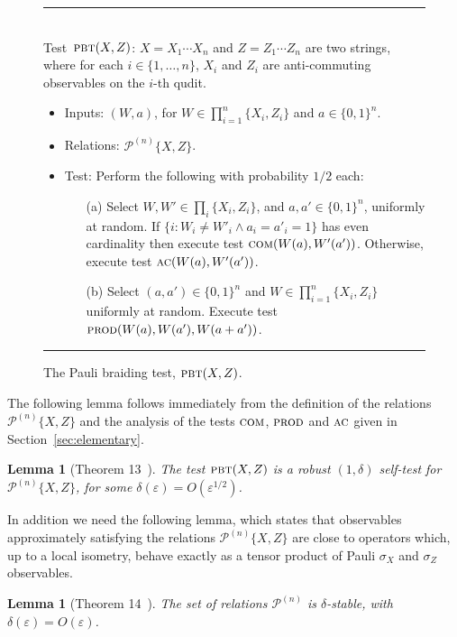 \documentclass[11pt]{article}
\newtheorem{lemma}[theorem]{Lemma}
\theoremstyle{remark}
\theoremstyle{definition}
\newcommand{\eps}{\varepsilon}
\newcommand{\pbt}{\textsc{pbt}}
\newcommand{\prodt}{\textsc{prod}}
\newcommand{\comt}{\textsc{com}}
\newcommand{\act}{\textsc{ac}}
\newcommand{\paulin}{\mathcal{P}^{(n)}\!}
\begin{document}
\begin{figure}[H]
\rule[1ex]{16.5cm}{0.5pt}\\
Test~$\pbt(X,Z)$: $X=X_1\cdots X_n$ and $Z=Z_1\cdots Z_n$ are two strings, where for each $i\in\{1,\ldots,n\}$, $X_i$ and $Z_i$ are anti-commuting observables on the $i$-th qudit. 
\begin{itemize}
\item Inputs: $(W,a)$, for $W\in\prod_{i=1}^n\{X_i,Z_i\}$ and $a\in\{0,1\}^n$.
\item Relations: $\paulin\{X,Z\}$.  
\item Test: Perform the following with probability $1/2$ each: 
\begin{enumerate}
\item[(a)] Select $W,W'\in \prod_i \{X_i,Z_i\}$, and $a,a'\in\{0,1\}^n$, uniformly at random. If $\{i: W_i\neq W'_i \wedge a_i=a'_i=1\}$ has even cardinality then execute test $\comt(W(a),W'(a'))$. Otherwise, execute test $\act(W(a),W'(a'))$. 
\item[(b)] Select $(a,a')\in\{0,1\}^n$ and $W\in\prod_{i=1}^n\{X_i,Z_i\}$ uniformly at random. Execute test $\prodt(W(a),W(a'),W(a+a'))$. 
\end{enumerate}
\end{itemize}
\rule[2ex]{16.5cm}{0.5pt}\vspace{-1cm}
\caption{The Pauli braiding test, $\pbt(X,Z)$.}
\label{fig:pbt}
\end{figure}

The following lemma follows immediately from the definition of the relations  $\paulin\{X,Z\}$ and the analysis of the tests $\comt$, $\prodt$ and $\act$ given in Section~\ref{sec:elementary}. 


\begin{lemma}[Theorem 13~\cite{natarajan2016robust}]\label{lem:pbt}
The test $\pbt(X,Z)$ is a robust $(1,\delta)$ self-test 
for $\paulin\{X,Z\}$, for some $\delta(\eps) = O(\eps^{1/2})$. 
\end{lemma}

In addition we need the following lemma, which states that observables approximately satisfying the relations $\paulin\{X,Z\}$ are close to operators which, up to a local isometry, behave exactly as a tensor product of Pauli $\sigma_X$ and $\sigma_Z$ observables. 


\begin{lemma}[Theorem 14~\cite{natarajan2016robust}]\label{lem:pauli-stable}
The set of relations $\mathcal{P}^{(n)}$ is $\delta$-stable, with $\delta(\eps) = O(\eps)$.
\end{lemma}
\end{document}
